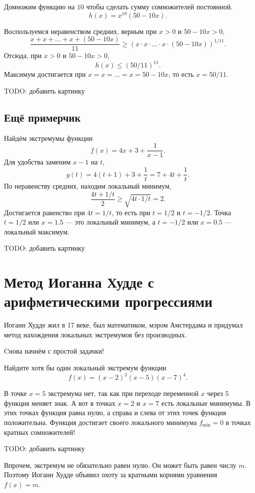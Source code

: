 \documentclass[12pt]{article}
\begin{document}
Домножим функцию на $10$ чтобы сделать сумму сомножителей постоянной.
\[
h(x) = x^{10}(50 - 10x).
\]

Воспользуемся неравенством средних, верным при $x > 0$ и $50 - 10x > 0$,
\[
\frac{x + x + \dots + x + (50 - 10x)}{11} \geq (x \cdot x \cdot \dots \cdot x \cdot (50 - 10x) )^{1/11}.
\]
Отсюда, при $x > 0$ и $50 - 10x > 0$,
\[
h(x) \leq (50/11)^{11}.
\]
Максимум достигается при $x = x = \dots = x = 50 - 10x$, то есть $x = 50/11$.

TODO: добавить картинку

\subsection*{Ещё примерчик}

Найдём экстремумы функции 
\[
f(x) = 4x + 3 + \frac{1}{x - 1}.
\]
Для удобства заменим $x - 1$ на $t$,
\[
g(t) = 4(t + 1) + 3 + \frac{1}{t} = 7 + 4t + \frac{1}{t}.
\]
По неравенству средних, находим локальный минимум,
\[
\frac{4t + 1/t}{2} \geq \sqrt{4t \cdot 1/t} = 2.
\]
Достигается равенство при $4t = 1/t$, то есть при $t = 1/2$ и $t = -1/2$.
Точка $t=1/2$ или $x = 1.5$ — это локальный минимум, а $t = -1/2$ или $x = 0.5$ — локальный максимум.


TODO: добавить картинку


\section{Метод Иоганна Худде с арифметическими прогрессиями}

Иоганн Худде жил в 17 веке, был математиком, мэром Амстердама и придумал метод нахождения локальных экстремумов без производных. 

Cнова начнём с простой задачки!

Найдите хотя бы один локальный экстремум функции
\[
f(x)  = (x - 2)^2 (x - 5) (x - 7)^4.
\]

В точке $x=5$ экстремума нет, так как при переходе переменной $x$ через $5$ функция меняет знак. 
А вот в точках $x = 2$ и $x = 7$ есть локальные минимумы. 
В этих точках функция равна нулю, а справа и слева от этих точек функция положительна. 
Функция достигает своего локального минимума $f_{\text{min}} = 0$ в точках кратных сомножителей!


TODO: добавить картинку


Впрочем, экстремум не обязательно равен нулю. 
Он может быть равен числу $m$.
Поэтому Иоганн Худде объявил охоту за кратными корнями уравнения $f(x) = m$.
\end{document}
